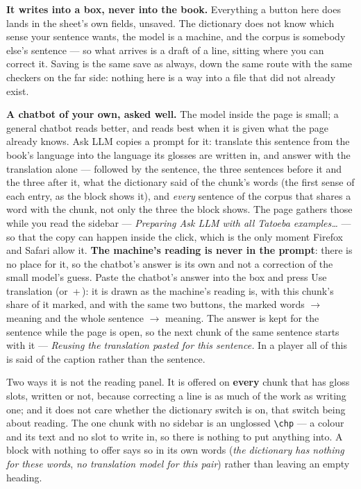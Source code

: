 \documentclass[11pt,oneside]{report}
\newcommand{\key}[1]{\textsf{\small\fbox{#1}}}
\newcommand{\menu}[1]{\textsf{#1}}
\begin{document}
\begin{goodbox}
\textbf{It writes into a box, never into the book.} Everything a button here
does lands in the sheet's own fields, unsaved. The dictionary does not know
which sense your sentence wants, the model is a machine, and the corpus is
somebody else's sentence --- so what arrives is a draft of a line, sitting
where you can correct it. Saving is the same \menu{save} as always, down the
same route with the same checkers on the far side: nothing here is a way into
a file that did not already exist.
\end{goodbox}

\textbf{A chatbot of your own, asked well.} The model inside the page is
small; a general chatbot reads better, and reads best when it is given what
the page already knows. \menu{Ask LLM} copies a prompt for it: translate this
sentence from the book's language into the language its glosses are written
in, and answer with the translation alone --- followed by the sentence, the
three sentences before it and the three after it, what the dictionary said
of the chunk's words (the first sense of each entry, as the block shows it),
and \emph{every} sentence of the corpus that shares a word with the chunk,
not only the three the block shows. The page gathers those while you read
the sidebar --- \emph{Preparing Ask LLM with all Tatoeba examples\ldots} ---
so that the copy can happen inside the click, which is the only moment
Firefox and Safari allow it. \textbf{The machine's reading is never in the
prompt}: there is no place for it, so the chatbot's answer is its own and not
a correction of the small model's guess. Paste the chatbot's answer into the
box and press \menu{Use translation} (or \key{Ctrl}\,+\,\key{Enter}): it is
drawn as the machine's reading is, with this chunk's share of it marked, and
with the same two buttons, \menu{the marked words $\rightarrow$ meaning} and
\menu{the whole sentence $\rightarrow$ meaning}. The answer is kept for the
sentence while the page is open, so the next chunk of the same sentence
starts with it --- \emph{Reusing the translation pasted for this sentence.}
In a player all of this is said of the caption rather than the sentence.

Two ways it is not the reading panel. It is offered on \textbf{every}
chunk that has gloss slots, written or not, because correcting a line is as
much of the work as writing one; and it does not care whether the
\menu{dictionary} switch is on, that switch being about reading. The one chunk
with no sidebar is an unglossed \texttt{\textbackslash chp} --- a colour and its text and
no slot to write in, so there is nothing to put anything into. A block with
nothing to offer says so in its own words (\emph{the dictionary has nothing for
these words}, \emph{no translation model for this pair}) rather than leaving an
empty heading.
\end{document}
